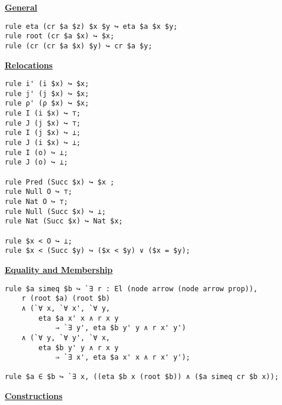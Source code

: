 \documentclass[submission,copyright,creativecommons]{eptcs}
\begin{document}
\begin{center}
\underline{\textbf{General}}
\end{center}

\begin{lstlisting}
rule eta (cr $a $z) $x $y ↪ eta $a $x $y;
rule root (cr $a $x) ↪ $x;
rule (cr (cr $a $x) $y) ↪ cr $a $y;
\end{lstlisting}

\begin{center}
\underline{\textbf{Relocations}}
\end{center}

\begin{lstlisting}
rule i' (i $x) ↪ $x;
rule j' (j $x) ↪ $x;
rule ρ' (ρ $x) ↪ $x;
rule I (i $x) ↪ ⊤;
rule J (j $x) ↪ ⊤;
rule I (j $x) ↪ ⊥;
rule J (i $x) ↪ ⊥;
rule I (o) ↪ ⊥;
rule J (o) ↪ ⊥;

rule Pred (Succ $x) ↪ $x ;
rule Null O ↪ ⊤;
rule Nat O ↪ ⊤;
rule Null (Succ $x) ↪ ⊥;
rule Nat (Succ $x) ↪ Nat $x;

rule $x < O ↪ ⊥;
rule $x < (Succ $y) ↪ ($x < $y) ∨ ($x = $y);
\end{lstlisting}

\begin{center}
\underline{\textbf{Equality and Membership}}
\end{center}

\begin{lstlisting}
rule $a simeq $b ↪ `∃ r : El (node arrow (node arrow prop)), 
    r (root $a) (root $b)
    ∧ (`∀ x, `∀ x', `∀ y, 
        eta $a x' x ∧ r x y
            ⇒ `∃ y', eta $b y' y ∧ r x' y')
    ∧ (`∀ y, `∀ y', `∀ x, 
        eta $b y' y ∧ r x y
            ⇒ `∃ x', eta $a x' x ∧ r x' y');

rule $a ∈ $b ↪ `∃ x, ((eta $b x (root $b)) ∧ ($a simeq cr $b x));
\end{lstlisting}

\begin{center}
\underline{\textbf{Constructions}}
\end{center}
\end{document}
